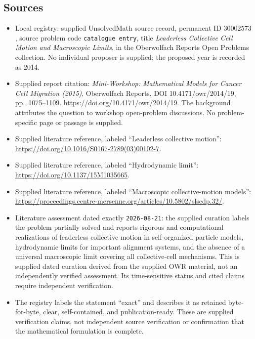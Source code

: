 \documentclass[11pt]{article}
\begin{document}
\subsection{Sources}
\begin{itemize}
\item Local registry: supplied UnsolvedMath source record, permanent ID \(30002573\), source problem code \texttt{catalogue entry}, title \emph{Leaderless Collective Cell Motion and Macroscopic Limits}, in the Oberwolfach Reports Open Problems collection. No individual proposer is supplied; the proposed year is recorded as 2014.
\item Supplied report citation: \emph{Mini-Workshop: Mathematical Models for Cancer Cell Migration (2015)}, Oberwolfach Reports, DOI 10.4171/owr/2014/19, pp.\ 1075--1109. \url{https://doi.org/10.4171/owr/2014/19}. The background attributes the question to workshop open-problem discussions. No problem-specific page or passage is supplied.
\item Supplied literature reference, labeled ``Leaderless collective motion'': \url{https://doi.org/10.1016/S0167-2789(03)00102-7}.
\item Supplied literature reference, labeled ``Hydrodynamic limit'': \url{https://doi.org/10.1137/15M1035665}.
\item Supplied literature reference, labeled ``Macroscopic collective-motion models'': \url{https://proceedings.centre-mersenne.org/articles/10.5802/slsedp.32/}.
\item Literature assessment dated exactly \texttt{2026-08-21}: the supplied curation labels the problem partially solved and reports rigorous and computational realizations of leaderless collective motion in self-organized particle models, hydrodynamic limits for important alignment systems, and the absence of a universal macroscopic limit covering all collective-cell mechanisms. This is supplied dated curation derived from the supplied OWR material, not an independently verified assessment. Its time-sensitive status and cited claims require independent verification.
\item The registry labels the statement ``exact'' and describes it as retained byte-for-byte, clear, self-contained, and publication-ready. These are supplied verification claims, not independent source verification or confirmation that the mathematical formulation is complete.
\end{itemize}
\end{document}
